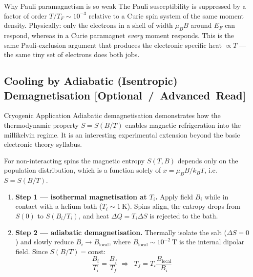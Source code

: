 \documentclass[11pt,a4paper]{article}
\newcommand{\extratag}{\hfill\mbox{\normalfont\footnotesize\sffamily\color{secondary}\textbf{[Optional / Advanced Read]}}}
\begin{document}
\begin{takeawaybox}{Why Pauli paramagnetism is so weak}
The Pauli susceptibility is suppressed by a factor of order $T/T_F \sim 10^{-3}$ relative to a Curie spin system of the same moment density. Physically: only the electrons in a shell of width $\mu_BB$ around $E_F$ can respond, whereas in a Curie paramagnet \emph{every} moment responds. This is the same Pauli-exclusion argument that produces the electronic specific heat $\propto T$ --- the same tiny set of electrons does both jobs.
\end{takeawaybox}

\subsection[Adiabatic Demagnetisation (Optional Read)]{Cooling by Adiabatic (Isentropic) Demagnetisation \extratag}
\label{sec:demag}

\begin{enrichmentnote}{Cryogenic Application}
Adiabatic demagnetisation demonstrates how the thermodynamic property $S = S(B/T)$ enables magnetic refrigeration into the millikelvin regime. It is an interesting experimental extension beyond the basic electronic theory syllabus.
\end{enrichmentnote}

For non-interacting spins the magnetic entropy $S(T,B)$ depends only on the population distribution, which is a function solely of $x = \mu_BB/k_BT$, i.e.\ $S = S(B/T)$.

\begin{enumerate}[leftmargin=1.6cm]
    \item \textbf{Step 1 --- isothermal magnetisation at $T_i$.} Apply field $B_i$ while in contact with a helium bath ($T_i\sim1\ \mathrm{K}$). Spins align, the entropy drops from $S(0)$ to $S(B_i/T_i)$, and heat $\Delta Q = T_i\Delta S$ is rejected to the bath.
    \item \textbf{Step 2 --- adiabatic demagnetisation.} Thermally isolate the salt ($\Delta S = 0$) and slowly reduce $B_i\to B_{\mathrm{local}}$, where $B_{\mathrm{local}}\sim10^{-2}\ \mathrm{T}$ is the internal dipolar field. Since $S(B/T) = \text{const}$:
    \begin{equation}
        \frac{B_i}{T_i} = \frac{B_f}{T_f}
        \;\Longrightarrow\;
        \boxed{\;T_f = T_i\frac{B_{\mathrm{local}}}{B_i}\;}
        \label{eq:demag}
    \end{equation}
\end{enumerate}
\end{document}

